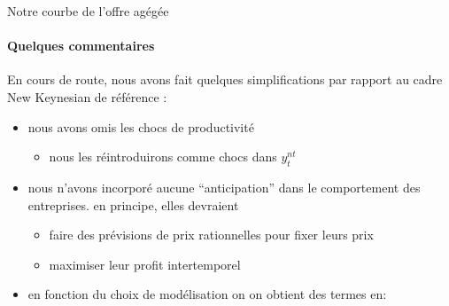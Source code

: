 \documentclass[
  ignorenonframetext,
  aspectratio=169,
]{beamer}
\providecommand{\tightlist}{%
  \setlength{\itemsep}{0pt}\setlength{\parskip}{0pt}}\usepackage{longtable,booktabs,array}
\begin{document}
\begin{frame}{Notre courbe de l'offre agégée}
\label{notre-courbe-de-loffre-aguxe9guxe9e-1}
\framesubtitle{Quelques commentaires}

En cours de route, nous avons fait quelques simplifications par rapport
au cadre New Keynesian de référence :

\begin{itemize}
\tightlist
\item
  nous avons omis les chocs de productivité

  \begin{itemize}
  \tightlist
  \item
    nous les réintroduirons comme chocs dans \(y^{nt}_t\)
  \end{itemize}
\item
  nous n'avons incorporé aucune ``anticipation'' dans le comportement
  des entreprises. en principe, elles devraient

  \begin{itemize}
  \tightlist
  \item
    faire des prévisions de prix rationnelles pour fixer leurs prix
  \item
    maximiser leur profit intertemporel
  \end{itemize}
\item
  en fonction du choix de modélisation on on obtient des termes en:

\end{itemize}
\end{frame}
\end{document}
